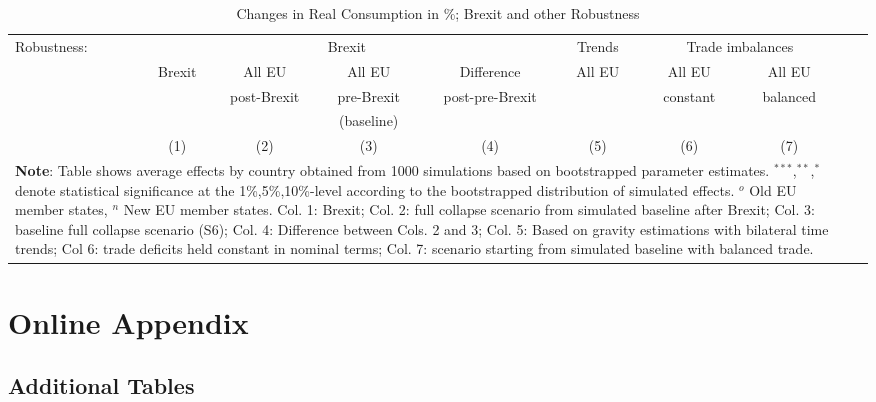 \documentclass[a4paper,12pt]{article}
\begin{document}
\begin{appendix}
\renewcommand{\tabcolsep}{.2cm}

\begin{table}[h!]
\caption{Changes in Real Consumption in \%; Brexit and other Robustness}
\centering
{\scriptsize
\begin{tabular}{lccccccccc}
\toprule						
Robustness: & \multicolumn{4}{c}{Brexit}&\multicolumn{1}{c}{Trends}   &\multicolumn{2}{c}{Trade imbalances} \\
 &	{Brexit} &	{All EU}	&	{All EU}	&	{Difference} &	{All EU}	&	{All EU} &	{All EU} \\
&	&    post-Brexit & pre-Brexit	& post-pre-Brexit &  & constant  & balanced  \\
& & & (baseline)\\
\cmidrule(rl){2-5}\cmidrule(rl){6-6}\cmidrule(rl){7-8}
& (1) & (2) & (3) & (4) & (5) &(6) &(7) \\
\midrule

\bottomrule
\multicolumn{8}{l}{\parbox[t]{5.75in}{\scriptsize{\textbf{Note}: Table shows average effects by country obtained from 1000 simulations based on bootstrapped parameter estimates.  $^{***}$,$^{**}$,$^{*}$ denote statistical significance at the 1\%,5\%,10\%-level according to the bootstrapped distribution of simulated effects. $^o$ Old EU member states, $^n$ New EU member states. Col. 1: Brexit; Col. 2: full collapse scenario from simulated baseline after Brexit; Col. 3: baseline full collapse scenario (S6); Col. 4: Difference between Cols. 2 and 3; Col. 5: Based on gravity estimations with bilateral time trends; Col 6: trade deficits held constant in nominal terms; Col. 7: scenario starting from simulated baseline with balanced trade.}}}
\end {tabular}}
\label{table_welfare_rob}

\end{table}

\clearpage




\section{Online Appendix}
\setcounter{table}{0}
\renewcommand{\thetable}{B\arabic{table}}
\setcounter{figure}{0}
\renewcommand{\thefigure}{B\arabic{figure}}



\newpage
\subsection{Additional Tables}



\end{appendix}
\end{document}
